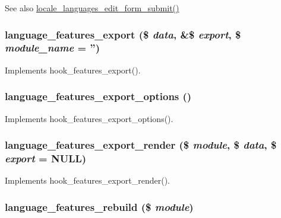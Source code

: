 \begin{DoxySeeAlso}{See also}
\hyperlink{group__locale_ga749200a912dbb5d31c5403d3fd909741}{locale\_\-languages\_\-edit\_\-form\_\-submit()} 
\end{DoxySeeAlso}
\hypertarget{features_8locale_8inc_a9cba8a9e6b287fb52f235b0fa6abfb1a}{
\subsubsection[{language\_\-features\_\-export}]{\setlength{\rightskip}{0pt plus 5cm}language\_\-features\_\-export (\$ {\em data}, \/  \&\$ {\em export}, \/  \$ {\em module\_\-name} = {\ttfamily ''})}}
\label{features_8locale_8inc_a9cba8a9e6b287fb52f235b0fa6abfb1a}
Implements hook\_\-features\_\-export(). \hypertarget{features_8locale_8inc_a1bd90e5855e637efaa9d3ab7efff7ce8}{
\subsubsection[{language\_\-features\_\-export\_\-options}]{\setlength{\rightskip}{0pt plus 5cm}language\_\-features\_\-export\_\-options ()}}
\label{features_8locale_8inc_a1bd90e5855e637efaa9d3ab7efff7ce8}
Implements hook\_\-features\_\-export\_\-options(). \hypertarget{features_8locale_8inc_ac6d5aee947234fef3a30f79700e27389}{
\subsubsection[{language\_\-features\_\-export\_\-render}]{\setlength{\rightskip}{0pt plus 5cm}language\_\-features\_\-export\_\-render (\$ {\em module}, \/  \$ {\em data}, \/  \$ {\em export} = {\ttfamily NULL})}}
\label{features_8locale_8inc_ac6d5aee947234fef3a30f79700e27389}
Implements hook\_\-features\_\-export\_\-render(). \hypertarget{features_8locale_8inc_a16d6aa7d5802ae4863d732698b776e1f}{
\subsubsection[{language\_\-features\_\-rebuild}]{\setlength{\rightskip}{0pt plus 5cm}language\_\-features\_\-rebuild (\$ {\em module})}}
